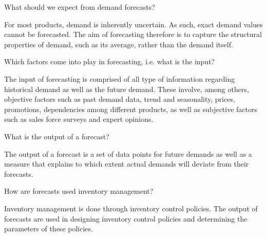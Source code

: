 \begin{exercise}
What should we expect from demand forecasts?



  \begin{solution}
	For most products, demand is inherently uncertain. As such, exact demand values cannot be forecasted. The aim of forecasting therefore is to capture the structural properties of demand, such as its average, rather than the demand itself.  
	

  \end{solution}
\end{exercise}

\begin{exercise}
Which factors come into play in forecasting, i.e. what is the input?



  \begin{solution}
    The input of forecasting is comprised of all type of information regarding historical demand as well as the future demand. These involve, among others, objective factors such as past demand data, trend and seasonality, prices, promotions, dependencies among different products, as well as subjective factors such as sales force surveys and expert opinions.     
  \end{solution}
\end{exercise}


\begin{exercise}
What is the output of a forecast?



  \begin{solution}
    The output of a forecast is a set of data points for future demands as well as a measure that explains to which extent actual demands will deviate from their forecasts.
  \end{solution}
\end{exercise}


\begin{exercise}
How are forecasts used inventory management?



  \begin{solution}
	Inventory management is done through inventory control policies. The output of forecasts are used in designing inventory control policies and determining the parameters of these policies.
  \end{solution}
\end{exercise}


